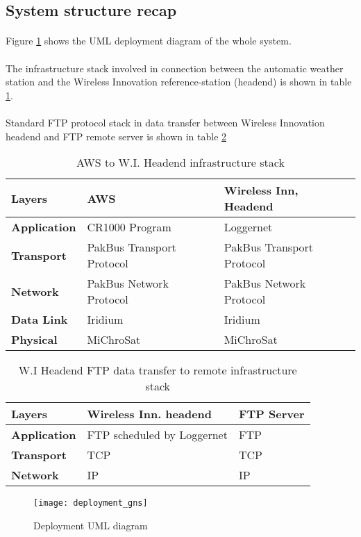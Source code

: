 \subsection{System structure recap}
\paragraph{}
Figure \ref{fig:depdiag} shows the UML deployment diagram of the whole system.
\paragraph{}
The infrastructure stack involved in connection between the automatic weather station and the Wireless Innovation reference-station (headend) is shown in table \ref{stack1}. 
\paragraph{}
Standard FTP protocol stack in data transfer between Wireless Innovation headend and FTP remote server is shown in table \ref{stack2}
\begin{table}[]
\centering
\begin{tabular}{|l|l|l|}
\hline
Layers            & \textbf{AWS}              & \textbf{Wireless Inn, Headend} \\ \hline
\textbf{Application} & CR1000 Program            & Loggernet                      \\ \hline
\textbf{Transport}   & PakBus Transport Protocol & PakBus Transport Protocol      \\ \hline
\textbf{Network}     & PakBus Network Protocol   & PakBus Network Protocol        \\ \hline
\textbf{Data Link}   & Iridium                   & Iridium                        \\ \hline
\textbf{Physical}    & MiChroSat                 & MiChroSat                      \\ \hline
\end{tabular}
\caption{AWS to W.I. Headend infrastructure stack}
\label{stack1}
\end{table}

\begin{table}[]
\centering
\begin{tabular}{|l|l|l|}
\hline
Layers           & \textbf{Wireless Inn. headend} & \textbf{FTP Server} \\ \hline
\textbf{Application} & FTP scheduled by Loggernet     & FTP                 \\ \hline
\textbf{Transport}   & TCP                            & TCP                 \\ \hline
\textbf{Network}     & IP                             & IP                  \\ \hline
\end{tabular}
\caption{W.I Headend FTP data transfer to remote infrastructure stack}
\label{stack2}
\end{table}

\begin{figure}
	\centering
	\texttt{[image: deployment\_gns]}
	\caption{Deployment UML diagram}
	\label{fig:depdiag}
\end{figure}